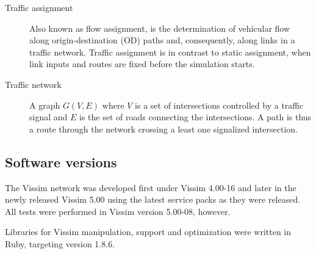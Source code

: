 \begin{description}
\item[Traffic assignment] Also known as flow assignment, is the determination of vehicular flow along origin-destination (OD) paths and, consequently, along links in a traffic network. Traffic assignment is in contrast to static assignment, when link inputs and routes are fixed before the simulation starts.

\item[Traffic network] A graph $G(V,E)$ where $V$ is a set of intersections controlled by a traffic signal and $E$ is the set of roads connecting the intersections. A path is thus a route through the network crossing a least one signalized intersection.

\end{description}

\subsection{Software versions}
The Vissim network was developed first under Vissim 4.00-16 and later in the newly released Vissim 5.00 using the latest service packs as they were released. All tests were performed in Vissim version 5.00-08, however. 

Libraries for Vissim manipulation, support and optimization were written in Ruby, targeting version 1.8.6.
